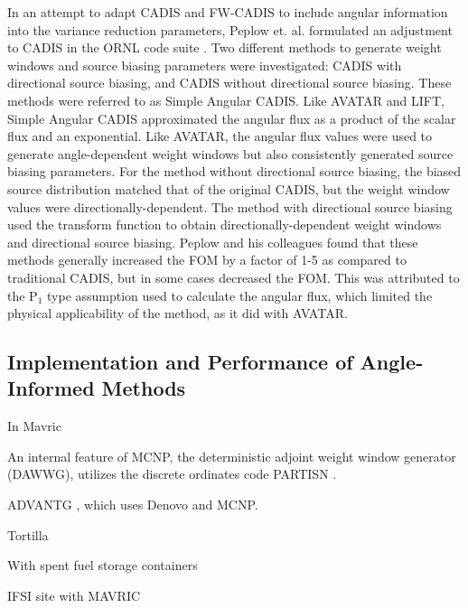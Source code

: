 In an attempt to adapt CADIS and FW-CADIS to include angular information into
the variance reduction parameters,
Peplow et. al. formulated an adjustment to CADIS in the ORNL
code suite \cite{peplow_consistent_2012}. Two different
methods to generate weight windows and source biasing parameters
were investigated:
CADIS with directional source biasing, and CADIS without directional source
biasing. These methods were referred to as Simple Angular CADIS. Like AVATAR and
LIFT, Simple Angular CADIS approximated the angular flux as a product of the
scalar flux and an exponential. Like AVATAR, the angular flux values
were used to
generate angle-dependent weight windows but also consistently generated source
biasing parameters. For the method without
directional source biasing, the biased source distribution matched that of the
original CADIS, but the weight window values were directionally-dependent. The
method with directional source biasing used the transform function to obtain
directionally-dependent weight windows and directional source biasing.
Peplow and his colleagues found
that these methods generally increased the FOM by a factor of 1-5 as compared to
traditional CADIS, but in some
cases decreased the FOM. This was attributed to the P$_1$ type assumption used
to calculate the angular flux, which limited the physical applicability of the
method, as it did with AVATAR.

\subsection{Implementation and Performance of Angle-Informed Methods}
\label{sec:resultsangle}

In Mavric \cite{peplow_advanced_2007}

An internal feature of MCNP, the deterministic adjoint weight window generator
(DAWWG), utilizes the discrete ordinates code PARTISN
\cite{sweezy_automated_2005}.

ADVANTG \cite{mosher_new_2010, wagner_review_2011, bevill_new_2012}, which uses
Denovo \cite{evans_denovo:_2010-1} and MCNP.

Tortilla \cite{somasundaram_implementation_2013}

With spent fuel storage containers \cite{chen_surface_2011}

IFSI site with MAVRIC \cite{sheu_dose_2011}


